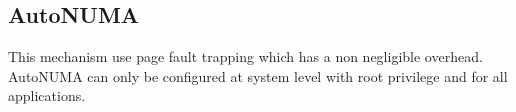 \subsection{AutoNUMA}
\label{sec:autonuma}


This mechanism use page fault trapping which has a non negligible overhead.
%
AutoNUMA can only be configured at system level with root privilege and for all applications.
